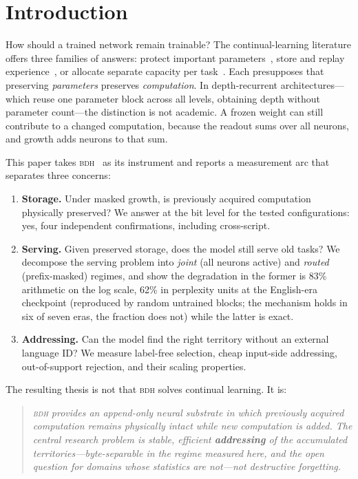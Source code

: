 \documentclass[11pt]{article}
\theoremstyle{definition}\newtheorem{definition}{Definition}
\theoremstyle{remark}\newtheorem{remark}{Remark}
\newcommand{\BDH}{\textsc{bdh}}
\begin{document}
\begin{abstract}
\end{abstract}

\section{Introduction}
\label{sec:intro}

How should a trained network remain trainable? The continual-learning literature offers three families of answers: protect important parameters~\cite{ewc}, store and replay experience~\cite{agem}, or allocate separate capacity per task~\cite{pgn,packnet}. Each presupposes that preserving \emph{parameters} preserves \emph{computation}. In depth-recurrent architectures---which reuse one parameter block across all levels, obtaining depth without parameter count---the distinction is not academic. A frozen weight can still contribute to a changed computation, because the readout sums over all neurons, and growth adds neurons to that sum.

This paper takes \BDH{}~\cite{bdh} as its instrument and reports a measurement arc that separates three concerns:

\begin{enumerate}
\item \textbf{Storage.} Under masked growth, is previously acquired computation physically preserved? We answer at the bit level for the tested configurations: yes, four independent confirmations, including cross-script.
\item \textbf{Serving.} Given preserved storage, does the model still serve old tasks? We decompose the serving problem into \emph{joint} (all neurons active) and \emph{routed} (prefix-masked) regimes, and show the degradation in the former is 83\% arithmetic on the log scale, 62\% in perplexity units at the English-era checkpoint (reproduced by random untrained blocks; the mechanism holds in six of seven eras, the fraction does not) while the latter is exact.
\item \textbf{Addressing.} Can the model find the right territory without an external language ID? We measure label-free selection, cheap input-side addressing, out-of-support rejection, and their scaling properties.
\end{enumerate}

The resulting thesis is not that \BDH{} solves continual learning. It is:

\begin{quote}\itshape
\BDH{} provides an append-only neural substrate in which previously acquired computation remains physically intact while new computation is added. The central research problem is stable, efficient \textbf{addressing} of the accumulated territories---byte-separable in the regime measured here, and the open question for domains whose statistics are not---not destructive forgetting.
\end{quote}
\end{document}
